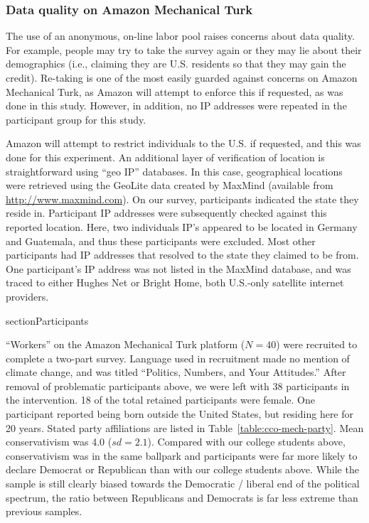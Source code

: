 \subsubsection{Data quality on Amazon Mechanical Turk}
\label{sec:mturk-problems}

The use of an anonymous, on-line labor pool raises concerns about data quality.
For example, people may try to take the survey again or they may lie about their
demographics (i.e., claiming they are U.S. residents so that they may gain the
credit). Re-taking is one of the most easily guarded against concerns on Amazon
Mechanical Turk, as Amazon will attempt to enforce this if requested, as was
done in this study. However, in addition, no IP addresses were repeated in the
participant group for this study.

Amazon will attempt to restrict individuals to the U.S. if requested, and this
was done for this experiment. An additional layer of verification of location is
straightforward using “geo IP” databases. In this case, geographical locations
were retrieved using the GeoLite data created by MaxMind (available from
\url{http://www.maxmind.com}). On our survey, participants indicated the state
they reside in. Participant IP addresses were subsequently checked against this
reported location. Here, two individuals IP’s appeared to be located in Germany
and Guatemala, and thus these participants were excluded. Most other
participants had IP addresses that resolved to the state they claimed to be
from. One participant’s IP address was not listed in the MaxMind database, and
was traced to either Hughes Net or Bright Home, both U.S.-only satellite
internet providers.

section{Participants}
\label{sec:CCO-ndi-participants}

“Workers” on the Amazon Mechanical Turk platform ($N=40$) were recruited to
complete a two-part survey. Language used in recruitment made no mention of
climate change, and was titled “Politics, Numbers, and Your Attitudes.” After
removal of problematic participants above, we were left with 38 participants in
the intervention. 18 of the total retained participants were female. One
participant reported being born outside the United States, but residing here for
20 years. Stated party affiliations are listed in
Table~\ref{table:cco-mech-party}. Mean conservativism was 4.0 ($sd=2.1$).
Compared with our college students above, conservativism was in the same
ballpark and participants were far more likely to declare Democrat or Republican
than with our college students above. While the sample is still clearly biased
towards the Democratic / liberal end of the political spectrum, the ratio
between Republicans and Democrats is far less extreme than previous samples. 

